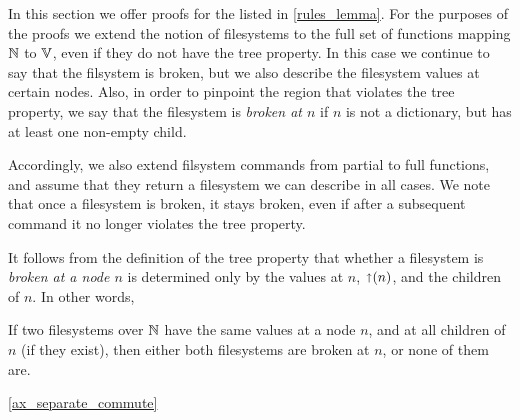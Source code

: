
In this section we offer proofs for the  listed in
\cref{rules_lemma}.
For the purposes of the proofs we extend the notion of filesystems 
to the full set of functions mapping $\mathbb{N}$ to $\mathbb{V}$, even if they
do not have the tree property.
In this case we continue to say that the filsystem is broken,
but we also describe the filesystem values at certain nodes.
Also, in order to pinpoint the region that violates the tree property,
we say that the filesystem is \emph{broken at $n$} if 
$n$ is not a dictionary, but has at least one non-empty child.

Accordingly, we also extend filsystem commands from partial to full functions,
and assume that they return a filesystem we can describe in all cases.
We note that once a filesystem is broken, it stays broken, even if
after a subsequent command it no longer violates the tree property.

It follows from the definition of the tree property that
whether a filesystem is \emph{broken at a node $n$} is determined only
by the values at $n$, $\mathord{\shortuparrow}({n})$, and the children of $n$.
In other words,

\begin{myclm}
If two filesystems over $\mathbb{N}$ have the same values at a node $n$,
and at all children of $n$ (if they exist),
then either both filesystems are broken at $n$, or none of them are.
\end{myclm}

\cref{ax_separate_commute}


